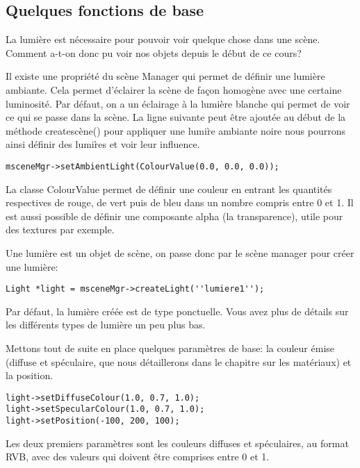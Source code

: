 \documentclass[10pt,a4paper]{report}
\begin{document}
\subsection{Quelques fonctions de base}

La lumi\`ere est n\'ecessaire pour pouvoir voir quelque chose dans une sc\`ene. Comment a-t-on donc pu voir nos objets depuis le d\'ebut de ce cours?

Il existe une propri\'et\'e du sc\`ene Manager qui permet de d\'efinir une lumi\`ere ambiante. Cela permet d'\'eclairer la sc\`ene de fa\c{c}on homog\`ene avec une certaine luminosit\'e. Par d\'efaut, on a un \'eclairage \`{a} la lumi\`ere blanche qui permet de voir ce qui se passe dans la sc\`ene. La ligne suivante peut \^etre ajout\'ee au d\'ebut de la m\'ethode createsc\`ene() pour appliquer une lumi\`re ambiante noire nous pourrons ainsi d\'efinir des lumi\`res et voir leur influence.

\begin{lstlisting}
msceneMgr->setAmbientLight(ColourValue(0.0, 0.0, 0.0));
\end{lstlisting}



La classe ColourValue permet de d\'efinir une couleur en entrant les quantit\'es respectives de rouge, de vert puis de bleu dans un nombre compris entre 0 et 1. Il est aussi possible de d\'efinir une composante alpha (la transparence), utile pour des textures par exemple.

Une lumi\`ere est un objet de sc\`ene, on passe donc par le sc\`ene manager pour cr\'eer une lumi\`ere:
\begin{lstlisting}
Light *light = msceneMgr->createLight(''lumiere1'');
\end{lstlisting}

Par d\'efaut, la lumi\`ere cr\'e\'ee est de type ponctuelle. Vous avez plus de d\'etails sur les diff\'erents types de lumi\`ere un peu plus bas.

Mettons tout de suite en place quelques param\`etres de base: la couleur \'emise (diffuse et sp\'eculaire, que nous d\'etaillerons dans le chapitre sur les mat\'eriaux) et la position.
\begin{lstlisting}
light->setDiffuseColour(1.0, 0.7, 1.0);
light->setSpecularColour(1.0, 0.7, 1.0);
light->setPosition(-100, 200, 100);
\end{lstlisting}




Les deux premiers param\`etres sont les couleurs diffuses et sp\'eculaires, au format RVB, avec des valeurs qui doivent \^etre comprises entre 0 et 1.
\end{document}
